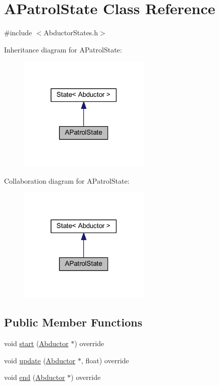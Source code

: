\hypertarget{class_a_patrol_state}{}\section{A\+Patrol\+State Class Reference}
\label{class_a_patrol_state}


{\ttfamily \#include $<$Abductor\+States.\+h$>$}



Inheritance diagram for A\+Patrol\+State\+:\nopagebreak
\begin{figure}[H]
\begin{center}
\leavevmode
\includegraphics[width=177pt]{class_a_patrol_state__inherit__graph}
\end{center}
\end{figure}


Collaboration diagram for A\+Patrol\+State\+:\nopagebreak
\begin{figure}[H]
\begin{center}
\leavevmode
\includegraphics[width=177pt]{class_a_patrol_state__coll__graph}
\end{center}
\end{figure}
\subsection*{Public Member Functions}
\begin{DoxyCompactItemize}
\item 
void \hyperlink{class_a_patrol_state_ad8772aee88fa833b742c722138d33174}{start} (\hyperlink{class_abductor}{Abductor} $\ast$) override
\item 
void \hyperlink{class_a_patrol_state_adc21543780010bc78a157827a7e253b8}{update} (\hyperlink{class_abductor}{Abductor} $\ast$, float) override
\item 
void \hyperlink{class_a_patrol_state_ad4e43d5ad9c9aa4ec543b836b58c06e8}{end} (\hyperlink{class_abductor}{Abductor} $\ast$) override
\end{DoxyCompactItemize}
